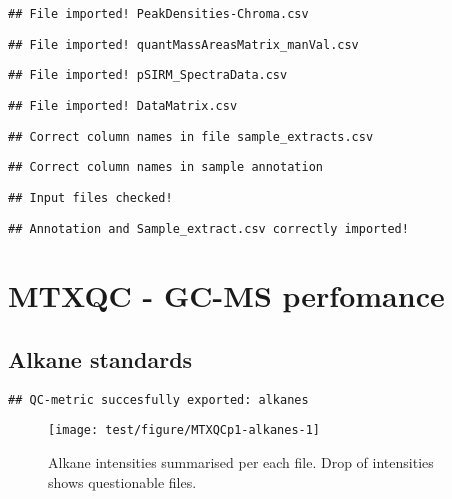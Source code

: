 \documentclass[9pt,]{article}
\begin{document}
\begin{verbatim}
## File imported! PeakDensities-Chroma.csv
\end{verbatim}

\begin{verbatim}
## File imported! quantMassAreasMatrix_manVal.csv
\end{verbatim}

\begin{verbatim}
## File imported! pSIRM_SpectraData.csv
\end{verbatim}

\begin{verbatim}
## File imported! DataMatrix.csv
\end{verbatim}

\begin{verbatim}
## Correct column names in file sample_extracts.csv
\end{verbatim}

\begin{verbatim}
## Correct column names in sample annotation
\end{verbatim}

\begin{verbatim}
## Input files checked!
\end{verbatim}

\begin{verbatim}
## Annotation and Sample_extract.csv correctly imported!
\end{verbatim}

\section{MTXQC - GC-MS perfomance}\label{mtxqc---gc-ms-perfomance}

\subsection{Alkane standards}\label{alkane-standards}

\begin{verbatim}
## QC-metric succesfully exported: alkanes
\end{verbatim}

\begin{figure}

{\centering \texttt{[image: test/figure/MTXQCp1-alkanes-1]} 

}

\caption{Alkane intensities summarised per each file. Drop of intensities shows questionable files.}\label{fig:alkanes}
\end{figure}
\end{document}
